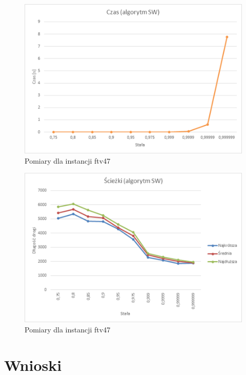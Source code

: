 \documentclass{article}
\begin{document}
\begin{figure}[ht]

\includegraphics[width=1\textwidth]{./SW.png}
\caption{Pomiary dla instancji ftv47}

\end{figure}

\begin{figure}[ht]

\includegraphics[width=1\textwidth]{./SW2.png}
\caption{Pomiary dla instancji ftv47}

\end{figure}

\section{Wnioski}
\end{document}
